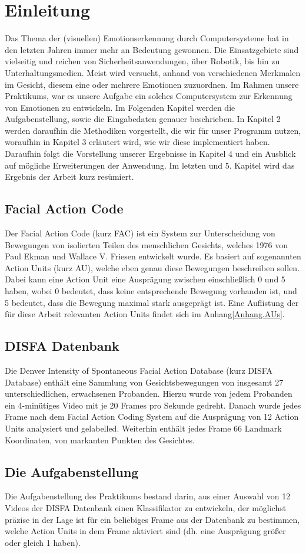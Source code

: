 \chapter{Einleitung}

Das Thema der (visuellen) Emotionserkennung durch Computersysteme hat in den letzten Jahren immer mehr an Bedeutung gewonnen.
Die Einsatzgebiete sind vielseitig und reichen von Sicherheitsanwendungen, über Robotik, bis hin zu Unterhaltungsmedien.
Meist wird versucht, anhand von verschiedenen Merkmalen im Gesicht, diesem eine oder mehrere Emotionen zuzuordnen. Im Rahmen
unsere Praktikums, war es unsere Aufgabe ein solches Computersystem zur Erkennung von Emotionen zu entwickeln.\newline
Im Folgenden Kapitel werden die Aufgabenstellung, sowie die Eingabedaten genauer beschrieben.
In Kapitel 2 werden daraufhin die Methodiken vorgestellt, die wir für unser Programm nutzen, woraufhin in Kapitel 3 erläutert wird,
wie wir diese implementiert haben. Daraufhin folgt die Vorstellung unserer Ergebnisse in Kapitel 4 und ein Ausblick auf mögliche
Erweiterungen der Anwendung. Im letzten und 5. Kapitel wird das Ergebnis der Arbeit kurz resümiert.

\section{Facial Action Code}
Der Facial Action Code (kurz FAC) ist ein System zur Unterscheidung von Bewegungen von isolierten Teilen des menschlichen Gesichts, welches
1976 von Paul Ekman und Wallace V. Friesen entwickelt wurde. Es basiert auf sogenannten Action Units (kurz AU), welche eben genau diese Bewegungen
beschreiben sollen. Dabei kann eine Action Unit eine Ausprägung zwischen einschließlich 0 und 5 haben, wobei 0 bedeutet, dass keine entsprechende
Bewegung vorhanden ist, und 5 bedeutet, dass die Bewegung maximal stark ausgeprägt ist. Eine Auflistung der für diese Arbeit relevanten Action Units
findet sich im Anhang\ref{Anhang.AUs}.

\section{DISFA Datenbank}
Die Denver Intensity of Spontaneous Facial Action Database (kurz DISFA Database) enthält eine Sammlung von Gesichtsbewegungen von insgesamt
27 unterschiedlichen, erwachsenen Probanden. Hierzu wurde von jedem Probanden ein 4-minütiges Video mit je 20 Frames pro Sekunde gedreht.
Danach wurde jedes Frame nach dem Facial Action Coding System auf die Ausprägung von 12 Action Units analysiert und gelabelled.\newline
Weiterhin enthält jedes Frame 66 Landmark Koordinaten, von markanten Punkten des Gesichtes.

\section{Die Aufgabenstellung}
Die Aufgabenstellung des Praktikums bestand darin, aus einer Auswahl von 12 Videos der DISFA Datenbank einen Klassifikator zu entwickeln,
der möglichst präzise in der Lage ist für ein beliebiges Frame aus der Datenbank zu bestimmen, welche Action Units in dem Frame aktiviert
sind (dh. eine Ausprägung größer oder gleich 1 haben).
